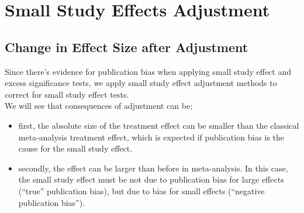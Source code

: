 
\section{Small Study Effects Adjustment}


\subsection{Change in Effect Size after Adjustment} \label{sec:change.size}

Since there's evidence for publication bias when applying small study effect and excess significance tests, we apply small study effect adjustment methods to correct for small study effect tests. \\
We will see that consequences of adjustment can be; 
\begin{itemize}
\item first, the absolute size of the treatment effect can be smaller than the classical meta-analysis treatment effect, which is expected if publication bias
is the cause for the small study effect.
\item secondly, the effect can be larger than before in meta-analysis. In this case, the small study effect must be not due to publication bias for large effects (``true'' publication bias), but due to bias for small effects (``negative publication bias'').
\end{itemize}

